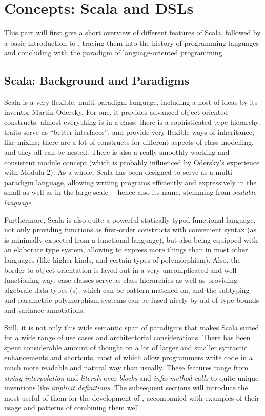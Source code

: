 \chapter{Concepts: Scala and DSLs}
\label{sec:concepts}

This part will first give a short overview of different features of Scala, followed by a basic
introduction to \dsls, tracing them into the history of programming languages and concluding with
the paradigm of language-oriented programming.


\section{Scala: Background and Paradigms}
\label{sec:scala}

Scala is a very flexible, multi-paradigm language, including a host of ideas by its
inventor Martin Odersky. For one, it provides advanced object-oriented constructs: almost everything
is in a class; there is a sophisticated type hierarchy; traits serve as \enquote{better interfaces},
and provide very flexible ways of inheritance, like mixins; there are a lot of constructs for
different aspects of class modelling, and they all can be nested. There is also a really smoothly
working and consistent module concept (which is probably influenced by Odersky's experience with
Modula-2). As a whole, Scala has been designed to serve as a multi-paradigm language, allowing
writing programs efficiently and expressively in the small as well as in the large scale~-- hence
also its name, stemming from \emph{scalable language}.

Furthermore, Scala is also quite a powerful statically typed functional language, not only providing
functions as first-order constructs with convenient syntax (as is minimally expected from a
functional language), but also being equipped with an elaborate type system, allowing to express
more things than in most other languages (like higher kinds, and certain types of
polymorphism). Also, the border to object-orientation is layed out in a very uncomplicated and
well-functioning way: case classes serve as class hierarchies as well as providing algebraic data
types (s), which can be pattern matched on, and the subtyping and parametric
polymorphism systems can be fused nicely by aid of type bounds and variance annotations.

Still, it is not only this wide semantic span of paradigms that makes Scala suited for a wide range
of use cases and architectorial considerations. There has been spent considerable amount of thought
on a lot of larger and smaller syntactic enhancements and shortcuts, most of which allow programmers
write code in a much more readable and natural way than usually. These features range from
\emph{string interpolation} and \emph{ literals} over \emph{blocks} and \emph{infix
  method calls} to quite unique inventions like \emph{implicit definitions}. The subsequent sections
will introduce the most useful of them for the development of \dsls, accompanied with examples of
their usage and patterns of combining them well.

